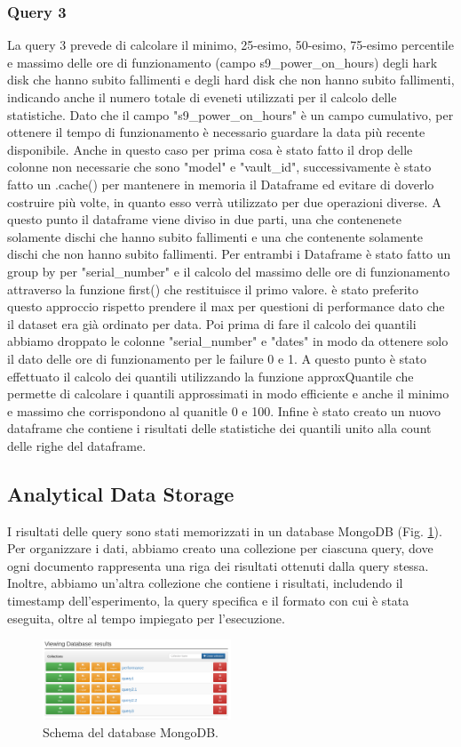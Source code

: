 \documentclass[conference]{IEEEtran}
\begin{document}
\subsubsection{Query 3}
La query 3 prevede di calcolare il minimo, 25-esimo, 50-esimo, 75-esimo percentile e massimo delle ore di funzionamento (campo s9\_power\_on\_hours) degli hark disk che hanno subito fallimenti e degli hard disk che non hanno subito fallimenti, indicando anche il numero totale di eveneti utilizzati per il calcolo delle statistiche.
Dato che il campo "s9\_power\_on\_hours" è un campo cumulativo, per ottenere il tempo di funzionamento è necessario guardare la data più recente disponibile.
Anche in questo caso per prima cosa è stato fatto il drop delle colonne non necessarie che sono "model" e "vault\_id", successivamente è stato fatto un .cache() per mantenere in memoria il Dataframe ed evitare di doverlo costruire più volte, in quanto esso verrà utilizzato per due operazioni diverse. A questo punto il dataframe viene diviso in due parti, una che contenenete solamente dischi che hanno subito fallimenti e una che contenente solamente dischi che non hanno subito fallimenti. Per entrambi i Dataframe è stato fatto un group by per "serial\_number" e il calcolo del massimo delle ore di funzionamento attraverso la funzione first() che restituisce il primo valore. è stato preferito questo approccio rispetto prendere il max per questioni di performance dato che il dataset era già ordinato per data. Poi prima di fare il calcolo dei quantili abbiamo droppato le colonne "serial\_number" e "dates" in modo da ottenere solo il dato delle ore di funzionamento per le failure 0 e 1. A questo punto è stato effettuato il calcolo dei quantili utilizzando la funzione approxQuantile che permette di calcolare i quantili approssimati in modo efficiente e anche il minimo e massimo che corrispondono al quanitle 0 e 100. Infine è stato creato un nuovo dataframe che contiene i risultati delle statistiche dei quantili unito alla count delle righe del dataframe.

\subsection{Analytical Data Storage}
I risultati delle query sono stati memorizzati in un database MongoDB (Fig. \ref{fig:mongo}).
Per organizzare i dati, abbiamo creato una collezione per ciascuna query, dove ogni documento rappresenta una riga dei risultati ottenuti dalla query stessa. Inoltre, abbiamo un'altra collezione che contiene i risultati, includendo il timestamp dell'esperimento, la query specifica e il formato con cui è stata eseguita, oltre al tempo impiegato per l'esecuzione.
\begin{figure}[htbp]
    \centerline{\includegraphics[width=0.5\textwidth]{res/mongo.png}}
    \caption{Schema del database MongoDB.}
    \label{fig:mongo}
\end{figure}
\end{document}
